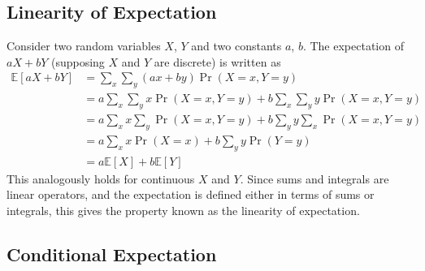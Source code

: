 \documentclass[11pt]{report} %
\begin{document}
\subsection{Linearity of Expectation}

Consider two random variables $X$, $Y$ and two constants $a$, $b$. The expectation of $aX + bY$ (supposing $X$ and $Y$ are discrete) is written as
\begin{align}
\mathbb{E}\left[aX + bY\right] &= \sum_{x}\sum_{y}\left(ax + by\right)\operatorname{Pr}\left(X = x, Y = y\right) \\
&= a\sum_{x}\sum_{y}x\operatorname{Pr}\left(X = x, Y = y\right) + b\sum_{x}\sum_{y}y\operatorname{Pr}\left(X = x, Y = y\right) \\
&= a\sum_{x}x\sum_{y}\operatorname{Pr}\left(X = x, Y = y\right) + b\sum_{y}y\sum_{x}\operatorname{Pr}\left(X = x, Y = y\right) \\
&= a\sum_{x}x\operatorname{Pr}\left(X = x\right) + b\sum_{y}y\operatorname{Pr}\left(Y = y\right) \\
&= a\mathbb{E}\left[X\right] + b\mathbb{E}\left[Y\right]
\end{align}
This analogously holds for continuous $X$ and $Y$. Since sums and integrals are linear operators, and the expectation is defined either in terms of sums or integrals, this gives the property known as the linearity of expectation.

\subsection{Conditional Expectation}
\end{document}
